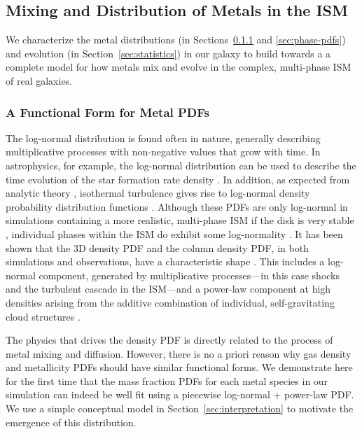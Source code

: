 \subsection{Mixing and Distribution of Metals in the ISM}
\label{sec:mixing}
We characterize the metal distributions (in Sections~\ref{sec:log-normal} and \ref{sec:phase-pdfs}) and evolution (in Section~\ref{sec:statistics}) in our galaxy to build towards a  a complete model for how metals mix and evolve in the complex, multi-phase ISM of real galaxies.

\subsubsection{A Functional Form for Metal PDFs}
\label{sec:log-normal}

The log-normal distribution is found often in nature, generally describing multiplicative processes with non-negative values that grow with time. In astrophysics, for example, the log-normal distribution can be used to describe the time evolution of the star formation rate density \citep[see ][]{Gladders2013,Abramson2016,Diemer2017}. In addition, as expected from analytic theory \citep{Vazquez-Semadeni1994}, isothermal turbulence gives rise to log-normal density probability distribution functions \citep[PDFs;][]{Padoan1997, Passot1998, Ostriker1999,PadoanNordlund2002,KrumholzMcKee2005,Federrath2008}. Although these PDFs are only log-normal in simulations containing a more realistic, multi-phase ISM \citep{Scalo1998} if the disk is very stable \citep{WadaNorman2007}, individual phases within the ISM do exhibit some log-normality \citep{Tasker2009, Tasker2011,Joung2009,PriceFederrathBrunt2011, HQM2012}. It has been shown that the 3D density PDF and the column density PDF, in both simulations and observations, have a characteristic shape \citep{Vazquez-Semadeni1994,Burkhart2009, FederrathKlessen2013, Collins2012, Myers2015, Burkhart2017, Chen2018}. This includes a log-normal component, generated by multiplicative processes---in this case shocks and the turbulent cascade in the ISM---and a power-law component at high densities arising from the additive combination of individual, self-gravitating cloud structures .

The physics that drives the density PDF is directly related to the process of metal mixing and diffusion. However, there is no a priori reason why gas density and metallicity PDFs should have similar functional forms. We demonstrate here for the first time that the mass fraction PDFs for each metal species in our simulation can indeed be well fit using a piecewise log-normal + power-law PDF. We use a simple conceptual model in Section~\ref{sec:interpretation} to motivate the emergence of this distribution.

